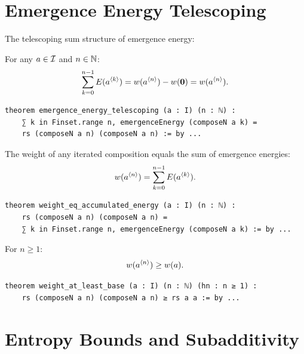 \section{Emergence Energy Telescoping}

The telescoping sum structure of emergence energy:

\begin{theorem}
\label{thm:emergence-energy-telescoping}
For any $a \in \mathcal{I}$ and $n \in \mathbb{N}$:
\[
  \sum_{k=0}^{n-1} E(a^{\langle k \rangle}) = w(a^{\langle n \rangle}) - w(\mathbf{0}) = w(a^{\langle n \rangle}).
\]
\end{theorem}

\begin{lstlisting}[caption={Energy telescoping (IDT\_v3\_Emergence.lean)}]
theorem emergence_energy_telescoping (a : I) (n : ℕ) :
    ∑ k in Finset.range n, emergenceEnergy (composeN a k) =
    rs (composeN a n) (composeN a n) := by ...
\end{lstlisting}

\begin{theorem}
\label{thm:weight-eq-accumulated-energy}
The weight of any iterated composition equals the sum of emergence energies:
\[
  w(a^{\langle n \rangle}) = \sum_{k=0}^{n-1} E(a^{\langle k \rangle}).
\]
\end{theorem}

\begin{lstlisting}[caption={Weight accumulated energy (IDT\_v3\_Emergence.lean)}]
theorem weight_eq_accumulated_energy (a : I) (n : ℕ) :
    rs (composeN a n) (composeN a n) =
    ∑ k in Finset.range n, emergenceEnergy (composeN a k) := by ...
\end{lstlisting}

\begin{theorem}
\label{thm:weight-at-least-base}
For $n \geq 1$:
\[
  w(a^{\langle n \rangle}) \geq w(a).
\]
\end{theorem}

\begin{lstlisting}[caption={Weight at least base (IDT\_v3\_Emergence.lean)}]
theorem weight_at_least_base (a : I) (n : ℕ) (hn : n ≥ 1) :
    rs (composeN a n) (composeN a n) ≥ rs a a := by ...
\end{lstlisting}


\section{Entropy Bounds and Subadditivity}

